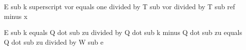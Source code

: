 E sub k superscript vor equals one divided by T sub vor divided by T sub ref minus x

E sub k equals Q dot sub zu divided by Q dot sub k minus Q dot sub zu equals Q dot sub zu divided by W sub e